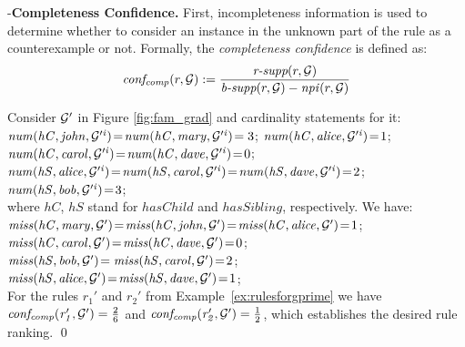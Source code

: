 \noindent -\textbf{Completeness Confidence.} First, incompleteness information is used to determine whether to consider an instance in the unknown part of the rule as a counterexample or not. Formally, the \emph{completeness confidence} is defined as:
\begin{align*}
\mathit{conf_{comp}}(r,\mathcal{G}) := \frac{\textit{r-supp}(r,\mathcal{G})}{\textit{b-supp}(r,\mathcal{G}) - \mathit{npi}(r,\mathcal{G})}
\end{align*}
\begin{example}
Consider $\mathcal{G}'$ in Figure \ref{fig:fam_grad}
and cardinality statements for it:\\
$\mathit{num(hC,john,\mathcal{G}'^i)}\!=\!\mathit{num(hC,mary,\mathcal{G}'^i)}\!=3$; $\mathit{num(hC,alice,\mathcal{G}'^i)}\!=\!1$; \\
$\mathit{num(hC,carol,\mathcal{G}'^i)}\!=\!\mathit{num(hC,dave,\mathcal{G}'^i)}\!=\!0$;\\
$\mathit{num(hS,alice,\mathcal{G}'^i)}\!=\!\mathit{num(hS,carol,\mathcal{G}'^i)}\!=\!\mathit{num(hS,dave,\mathcal{G}'^i)}\!=\!2$;\\ 
$\mathit{num(hS,bob,\mathcal{G}'^i)}\!=\!3$;\\
where $hC$, $hS$ stand for $hasChild$ and $hasSibling$, respectively. We have:\\
$\mathit{miss(hC,mary,\mathcal{G}')}\!=\!\mathit{miss(hC,john,\mathcal{G}')}\!=\!\mathit{miss(hC,alice,\mathcal{G}')}\!=\!1$;\\ 
$\mathit{miss(hC,carol,\mathcal{G}')}\!=\!\mathit{miss(hC,dave,\mathcal{G}')}\!=\!0$;\\
$\mathit{miss(hS,bob,\mathcal{G}')}\!=\mathit{miss(hS,carol,\mathcal{G}')}\!=\!2$;\\
$\mathit{miss(hS,alice,\mathcal{G}')}\!=\!\mathit{miss(hS,dave,\mathcal{G}')}\!=\!1$;\\
For the rules $r_1'$ and $r_2'$ from Example~\ref{ex:rulesforgprime} we have
 $\mathit{conf_{comp}(r_1', \mathcal{G}')}=\frac{2}{6}$ and $\mathit{conf_{comp}(r_2', \mathcal{G}')}=\frac{1}{2}$, which establishes the desired rule ranking.
\qed
\end{example}

